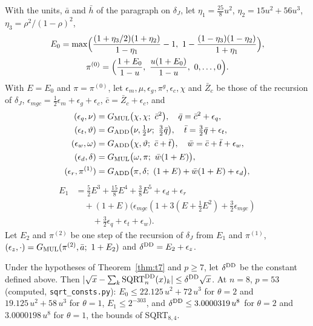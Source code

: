  With the units, $\bar a$ and $\bar h$ of the paragraph on $\delta_J$, let $\eta_1 =
\frac{25}{8}u^2$, $\eta_2 = 15u^2 + 56u^3$, $\eta_3 = \rho^2/(1-\rho)^2$,
\begin{gather*}
E_0 = \max\Bigl(\frac{(1 + \eta_3/2)(1+\eta_2)}{1-\eta_1} - 1,\ 1 - \frac{(1-\eta_3)(1-\eta_2)}{1+\eta_1}\Bigr),
\\
\pi^{(0)} = \Bigl(\frac{1+E_0}{1-u},\ \frac{u(1+E_0)}{1-u},\ 0, \dots, 0\Bigr).
\end{gather*}
With $E = E_0$ and $\pi = \pi^{(0)}$, let $\epsilon_m, \mu, \epsilon_g, \pi^g, \epsilon_c, \chi$ and $\bar Z_c$ be those
of the recursion of $\delta_J$, $\epsilon_{mgc} = \frac12\epsilon_m + \epsilon_g + \epsilon_c$, $\bar c = \bar Z_c + \epsilon_c$, and
\begin{align*}
(\epsilon_q, \nu) &= G_{\rm MUL}\bigl(\chi, \chi;\ \bar c^2\bigr), \quad \bar q = \bar c^2 + \epsilon_q, \\
(\epsilon_t, \vartheta) &= G_{\rm ADD}\bigl(\nu, \tfrac12\nu;\ \tfrac32\bar q\bigr), \quad \bar t = \tfrac32\bar q +
\epsilon_t, \\
(\epsilon_w, \omega) &= G_{\rm ADD}\bigl(\chi, \vartheta;\ \bar c + \bar t\bigr), \quad \bar w = \bar c + \bar t +
\epsilon_w, \\
(\epsilon_d, \delta) &= G_{\rm MUL}\bigl(\omega, \pi;\ \bar w(1+E)\bigr), \\
(\epsilon_r, \pi^{(1)}) &= G_{\rm ADD}\bigl(\pi, \delta;\ (1+E) + \bar w(1+E) + \epsilon_d\bigr),
\end{align*}
\begin{align*}
E_1 &= \tfrac52E^3 + \tfrac{15}8E^4 + \tfrac38E^5 + \epsilon_d + \epsilon_r \\
&\quad + (1+E)\bigl(\epsilon_{mgc}(1 + 3(E + \tfrac12E^2) + \tfrac32\epsilon_{mgc}) \\
&\qquad + \tfrac32\epsilon_q + \epsilon_t + \epsilon_w\bigr).
\end{align*}
Let $E_2$ and $\pi^{(2)}$ be one step of the recursion of $\delta_J$ from $E_1$ and $\pi^{(1)}$, $(\epsilon_z, \cdot) =
G_{\rm MUL}(\pi^{(2)}, \bar a;\ 1 + E_2)$ and $\delta^{\rm DD} = E_2 + \epsilon_z$.

\begin{theorem}\label{thm:t8}
Under the hypotheses of Theorem~\ref{thm:t7} and $p \ge 7$, let $\delta^{\rm DD}$ be the constant defined above.
Then $|\sqrt x - \sum_k
\mathrm{SQRT}^{\rm DD}_n(x)_k| \le \delta^{\rm DD}\sqrt x$. At $n = 8$, $p = 53$ (computed, \texttt{sqrt\_consts.py}): $E_0 \le 22.125\,u^2 + 72\,u^3$ for
$\theta = 2$ and $19.125\,u^2 + 58\,u^3$ for $\theta = 1$, $E_1 \le 2^{-303}$, and
$\delta^{\rm DD} \le 3.0000319\,u^8$ for $\theta = 2$ and $3.0000198\,u^8$ for $\theta = 1$, the bounds of SQRT$_{8,4}$.
\end{theorem}

